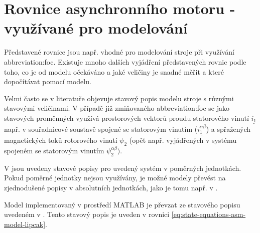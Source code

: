 \documentclass[a4paper, twoside, 11pt]{article}
\begin{document}
\section{Rovnice asynchronního motoru - využívané pro modelování}
Představené rovnice jsou např. vhodné pro modelování stroje při využívání \gls{abbreviation:foc}. Existuje mnoho dalších vyjádření představených rovnic podle toho, co je od modelu očekáváno a jaké veličiny je snadné měřit a které dopočítávat pomocí modelu.\par
Velmi často se v literatuře objevuje stavový popis modelu stroje s různými stavovými veličinami. V případě již zmiňovaného \gls{abbreviation:foc} se jako stavových proměnných využívá prostorových vektorů proudu statorového vinutí $\underline{i_1}$ např. v souřadnicové soustavě spojené se statorovým vinutím ($\underline{i_1^{\alpha\beta}}$) a spřažených magnetických toků rotorového vinutí $\psi_2$ (opět např. vyjádřených v systému spojeném se statorovým vinutím $\psi_2^{\alpha\beta})$.\par
V \cite{popescu-induction-motor-modelling-for-vector-control-purposes} jsou uvedeny stavové popisy pro uvedený systém v poměrných jednotkách. Pokud poměrné jednotky nejsou využívány, je možné modely převést na zjednodušené popisy v absolutních jednotkách, jako je tomu např. v \cite{lipcak-bauer-ept-moodle}.\par
Model implementovaný v prostředí MATLAB je převzat ze stavového popisu uvedeném v \cite{lipcak-bauer-ept-moodle}. Tento stavový popis je uveden v rovnici \ref{eq:state-equations-asm-model-lipcak}. 
\end{document}
